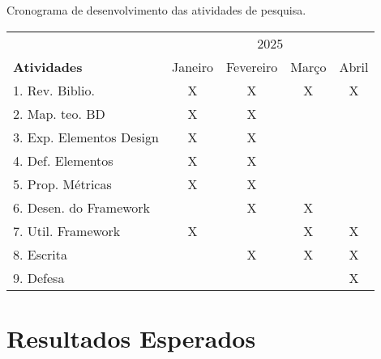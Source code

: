 \begin{quadro}[!htb]
    \centering
    \caption{Cronograma de desenvolvimento das atividades de pesquisa.}\label{cronograma}
    \begin{tabular}{|l|c|c|c|c|}
    \hline
    & \multicolumn{4}{|c|}{2025} \\ \cline{2-5}
    \textbf{Atividades}&  Janeiro&  Fevereiro&  Março& Abril\\ \hline  
    1. Rev. Biblio.&  X&  X&  X& X \\ \hline  
    2. Map. teo. BD&  X&  X&  & \\ \hline  
    3. Exp. Elementos Design&  X&  X&  & \\ \hline  
    4. Def. Elementos &  X&  X&  & \\ \hline  
    5. Prop. Métricas&  X&  X&  & \\ \hline  
    6. Desen. do Framework&  &  X&  X& \\ \hline  
    7. Util. Framework&  X&  &  X& X\\ \hline  
    8. Escrita&  &  X&  X& X\\ \hline  
    9. Defesa&  &  &  & X\\ \hline 
    \end{tabular}

    \vspace{1cm}
    
\end{quadro}

\section{Resultados Esperados}\label{resultados}
 

